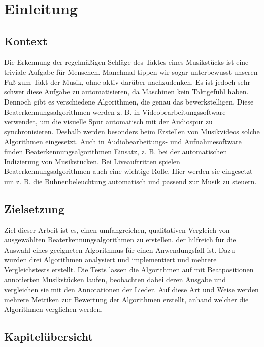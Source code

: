\chapter{Einleitung}
\label{einleitung}

\section{Kontext}
{
	Die Erkennung der regelmä{\ss}igen Schläge des Taktes eines Musikstücks ist eine triviale Aufgabe für Menschen.
	Manchmal tippen wir sogar unterbewusst unseren Fu{\ss} zum Takt der Musik,
		ohne aktiv darüber nachzudenken.
	Es ist jedoch sehr schwer diese Aufgabe zu automatisieren,
		da Maschinen kein Taktgefühl haben.
	Dennoch gibt es verschiedene Algorithmen,
		die genau das bewerkstelligen.
	Diese Beaterkennungsalgorithmen werden z. B. in Videobearbeitungssoftware verwendet,
		um die visuelle Spur automatisch mit der Audiospur zu synchronisieren.
	Deshalb werden besonders beim Erstellen von Musikvideos solche Algorithmen eingesetzt.
	Auch in Audiobearbeitungs- und Aufnahmesoftware finden Beaterkennungsalgorithmen Einsatz,
		z. B. bei der automatischen Indizierung von Musikstücken.
	Bei Liveauftritten spielen Beaterkennungsalgorithmen auch eine wichtige Rolle.
	Hier werden sie eingesetzt um z. B. die Bühnenbeleuchtung automatisch und passend zur Musik zu steuern.
}

\section{Zielsetzung}
{
	Ziel dieser Arbeit ist es,
		einen umfangreichen, qualitativen Vergleich von ausgewählten Beaterkennungsalgorithmen zu erstellen,
		der hilfreich für die Auswahl eines geeigneten Algorithmus für einen Anwendungsfall ist.
	Dazu wurden drei Algorithmen analysiert und implementiert
		und mehrere Vergleichstests erstellt.
	Die Tests lassen die Algorithmen auf mit Beatpositionen annotierten Musikstücken laufen,
		beobachten dabei deren Ausgabe
		und vergleichen sie mit den Annotationen der Lieder.
	Auf diese Art und Weise werden mehrere Metriken zur Bewertung der Algorithmen erstellt,
		anhand welcher die Algorithmen verglichen werden.
}

\section{Kapitelübersicht}
{
}

